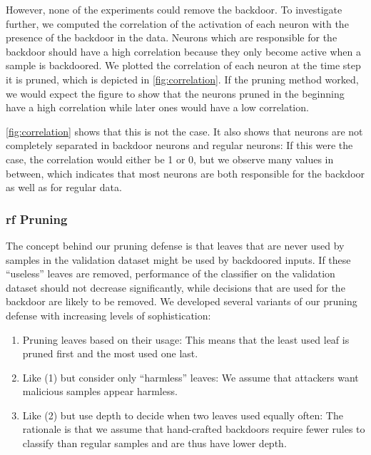 \documentclass[10pt,sigconf,letterpaper,dvipsnames]{acmart}
\newcommand\note[2]{{\color{#1}#2}}
\newcommand\todo[1]{{\note{red}{TODO: #1}}}
\begin{document}
However, none of the experiments could remove the backdoor.
To investigate further, we computed the correlation of the activation of each neuron with the presence of the backdoor in the data. Neurons which are responsible for the backdoor should have a high correlation because they only become active when a sample is backdoored. We  plotted the correlation of each neuron at the time step it is pruned, which is depicted in \autoref{fig:correlation}. If the pruning method worked, we would expect the figure to
show that the neurons pruned in the beginning have a high correlation while later ones would have a low correlation.

\autoref{fig:correlation} shows that this is not the case. It also shows that neurons are not completely separated in backdoor neurons and regular neurons: If this were the case, the correlation would either be 1 or 0, but we observe many values in between, which indicates that most neurons are both responsible for the backdoor as well as for regular data.

\subsubsection{\gls{rf} Pruning}

The concept behind our pruning defense is that leaves that are never used by samples in the validation dataset might be used by backdoored inputs. If these ``useless'' leaves are removed, performance of the classifier on the validation dataset should not decrease
significantly,
while decisions that are used for the backdoor are likely to be removed.
We developed several variants of our pruning defense with increasing levels of sophistication:
\begin{enumerate}[wide, labelwidth=!, labelindent=0pt]
\item Pruning leaves based on their usage: This means that the least used leaf is pruned first and the most used one last.
\item Like (1) but consider only ``harmless'' leaves: We assume that attackers want malicious samples appear harmless.
\item Like (2) but use depth to decide when two leaves used equally often: The rationale is that we assume that hand-crafted backdoors require fewer rules to classify than regular samples and are thus have lower depth.
\end{enumerate}
\end{document}
